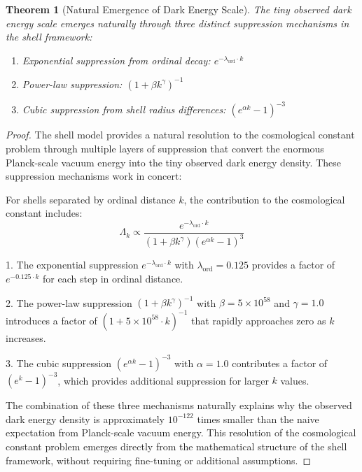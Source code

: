 \documentclass[12pt,a4paper]{article}
\newtheorem{theorem}{Theorem}[section]
\begin{document}
\begin{theorem}[Natural Emergence of Dark Energy Scale]
\label{thm:natural-emergence}
The tiny observed dark energy scale emerges naturally through three distinct suppression mechanisms in the shell framework:
\begin{enumerate}
    \item Exponential suppression from ordinal decay: $e^{-\lambda_{\text{ord}} \cdot k}$
    \item Power-law suppression: $(1 + \beta k^{\gamma})^{-1}$
    \item Cubic suppression from shell radius differences: $(e^{\alpha k} - 1)^{-3}$
\end{enumerate}
\end{theorem}

\begin{proof}
The shell model provides a natural resolution to the cosmological constant problem through multiple layers of suppression that convert the enormous Planck-scale vacuum energy into the tiny observed dark energy density. These suppression mechanisms work in concert:

For shells separated by ordinal distance $k$, the contribution to the cosmological constant includes:
\begin{equation}
\Lambda_k \propto \frac{e^{-\lambda_{\text{ord}} \cdot k}}{(1 + \beta k^{\gamma})(e^{\alpha k} - 1)^3}
\end{equation}

1. The exponential suppression $e^{-\lambda_{\text{ord}} \cdot k}$ with $\lambda_{\text{ord}} = 0.125$ provides a factor of $e^{-0.125 \cdot k}$ for each step in ordinal distance.

2. The power-law suppression $(1 + \beta k^{\gamma})^{-1}$ with $\beta = 5 \times 10^{58}$ and $\gamma = 1.0$ introduces a factor of $(1 + 5 \times 10^{58} \cdot k)^{-1}$ that rapidly approaches zero as $k$ increases.

3. The cubic suppression $(e^{\alpha k} - 1)^{-3}$ with $\alpha = 1.0$ contributes a factor of $(e^k - 1)^{-3}$, which provides additional suppression for larger $k$ values.

The combination of these three mechanisms naturally explains why the observed dark energy density is approximately $10^{-122}$ times smaller than the naive expectation from Planck-scale vacuum energy. This resolution of the cosmological constant problem emerges directly from the mathematical structure of the shell framework, without requiring fine-tuning or additional assumptions.
\end{proof}
\end{document}
